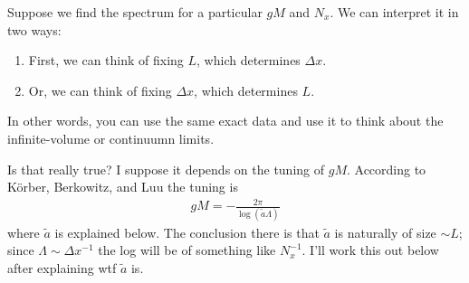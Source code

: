 Suppose we find the spectrum for a particular $gM$ and $N_x$.
We can interpret it in two ways:
\begin{enumerate}
	\item First, we can think of fixing $L$, which determines $\Delta x$.
	\item Or, we can think of fixing $\Delta x$, which determines $L$.
\end{enumerate}
In other words, you can use the same exact data and use it to think about the infinite-volume or continuumn limits.

Is that really true?  I suppose it depends on the tuning of $gM$.
According to K\"{o}rber, Berkowitz, and Luu the tuning is
\begin{align}
	gM = - \frac{2\pi}{\log(\tilde{a} \Lambda)}
\end{align}
where $\tilde{a}$ is explained below.
The conclusion there is that $\tilde{a}$ is naturally of size $\sim L$; since $\Lambda\sim \Delta x^{-1}$ the log will be of something like $N_x^{-1}$.
I'll work this out below after explaining wtf $\tilde{a}$ is.
